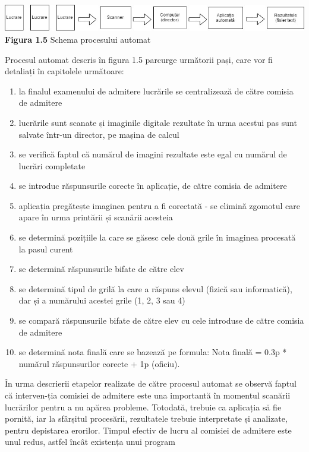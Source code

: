 \documentclass[a4paper,12pt]{report}
\newcommand\tab[1][1cm]{\hspace*{#1}}
\begin{document}
\begin {center} 
	\begin {footnotesize} 
		\includegraphics[width =155mm]{fig1_5} \\
		\textbf  {Figura 1.5} Schema procesului automat
	\end {footnotesize} 
\end {center}
\tab Procesul automat descris în figura 1.5 parcurge următorii pași, care vor fi detaliați în capitolele următoare:
\begin{enumerate}
\setlength\itemsep{1pt}
\item la finalul examenului de admitere lucrările se centralizează de către comisia de admitere
\item lucrările sunt scanate și imaginile digitale rezultate în urma acestui pas sunt salvate într-un director, pe mașina de calcul
\item se verifică faptul că numărul de imagini rezultate este egal cu numărul de lucrări completate
\item se introduc răspunsurile corecte în aplicație, de către comisia de admitere
\item aplicația pregătește imaginea pentru a fi corectată - se elimină zgomotul care apare în urma printării și scanării acesteia
\item se determină pozițiile la care se găsesc cele două grile în imaginea procesată la pasul curent
\item se determină răspunsurile bifate de către elev 
\item se determină tipul de grilă la care a răspuns elevul (fizică sau informatică), dar și a numărului acestei grile (1, 2, 3 sau 4)
\item se compară răspunsurile bifate de către elev cu cele introduse de către comisia de admitere
\item se determină nota finală care se bazează pe formula: Nota finală = 0.3p *  numărul răspunsurilor corecte + 1p (oficiu). 
\end{enumerate}
\tab În urma descrierii etapelor realizate de către procesul automat se observă faptul că interven-ția comisiei de admitere este una importantă în momentul scanării lucrărilor pentru a nu apărea probleme. Totodată, trebuie
ca aplicația să fie pornită, iar la sfârșitul procesării, rezultatele trebuie interpretate și analizate, pentru depistarea erorilor. Timpul efectiv de lucru al comisiei de admitere este unul redus, astfel încât existența unui program 
\end{document}
